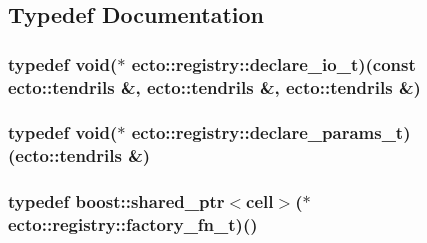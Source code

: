 \subsection{Typedef Documentation}
\hypertarget{namespaceecto_1_1registry_af52d8f0fff3baaf352e2523ab8ed7977}{
\subsubsection[{declare\-\_\-io\-\_\-t}]{\setlength{\rightskip}{0pt plus 5cm}typedef void($\ast$ ecto\-::registry\-::declare\-\_\-io\-\_\-t)(const {\bf ecto\-::tendrils} \&, {\bf ecto\-::tendrils} \&, {\bf ecto\-::tendrils} \&)}}\label{namespaceecto_1_1registry_af52d8f0fff3baaf352e2523ab8ed7977}
\hypertarget{namespaceecto_1_1registry_a04d849b45313a8ce9a602095e1edade9}{
\subsubsection[{declare\-\_\-params\-\_\-t}]{\setlength{\rightskip}{0pt plus 5cm}typedef void($\ast$ ecto\-::registry\-::declare\-\_\-params\-\_\-t)({\bf ecto\-::tendrils} \&)}}\label{namespaceecto_1_1registry_a04d849b45313a8ce9a602095e1edade9}
\hypertarget{namespaceecto_1_1registry_a3f75a16f135bcadb9bf1a7000b807b3b}{
\subsubsection[{factory\-\_\-fn\-\_\-t}]{\setlength{\rightskip}{0pt plus 5cm}typedef boost\-::shared\-\_\-ptr$<${\bf cell}$>$($\ast$ ecto\-::registry\-::factory\-\_\-fn\-\_\-t)()}}\label{namespaceecto_1_1registry_a3f75a16f135bcadb9bf1a7000b807b3b}


